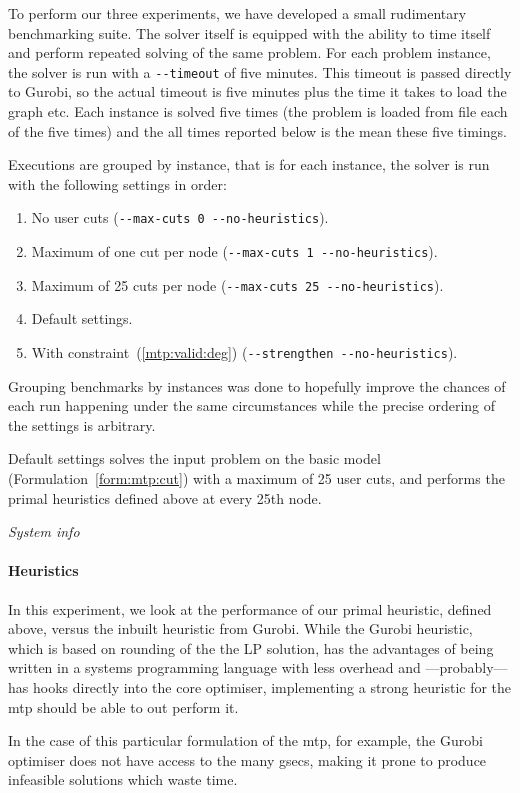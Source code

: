  To perform our three experiments, we have developed a small rudimentary benchmarking suite. The solver
 itself is equipped with the ability to time itself and perform repeated solving of the same problem.
 For each problem instance, the solver is run with a \texttt{-{}-timeout} of five minutes. This timeout
 is passed directly to Gurobi, so the actual timeout is five minutes plus the time it takes to load the
 graph etc. Each instance is solved five times (the problem is loaded from file each of the five times)
 and the all times reported below is the mean these five timings.

 Executions are grouped by instance, that is for each instance, the solver is run with the following
 settings in order:
 \begin{enumerate}
 \item No user cuts (\texttt{-{}-max-cuts 0 -{}-no-heuristics}).
 \item Maximum of one cut per node (\texttt{-{}-max-cuts 1 -{}-no-heuristics}).
 \item Maximum of 25 cuts per node (\texttt{-{}-max-cuts 25 -{}-no-heuristics}).
 \item Default settings.
 \item With constraint~(\ref{mtp:valid:deg}) (\texttt{-{}-strengthen -{}-no-heuristics}).
 \end{enumerate}
 Grouping benchmarks by instances was done to hopefully improve the chances of each run happening
 under the same circumstances while the precise ordering of the settings is arbitrary.
 
 Default settings solves the input problem on the basic model (Formulation~\ref{form:mtp:cut})
 with a maximum of 25 user cuts, and performs the primal heuristics defined above at every
 25th node.

\textit{System info}

\paragraph{Heuristics}
In this experiment, we look at the performance of our primal heuristic, defined above, versus
the inbuilt heuristic from Gurobi. While the Gurobi heuristic, which is based on rounding
of the the LP solution, has the advantages of being written in a systems programming language
with less overhead and ---probably--- has hooks directly into the core optimiser,
implementing a strong heuristic for the \gls{mtp} should be able to out perform it.

In the case of this particular formulation of the \gls{mtp},
for example, the Gurobi optimiser does not have access to the
many \glspl{gsec}, making it prone to produce infeasible solutions which waste time.

